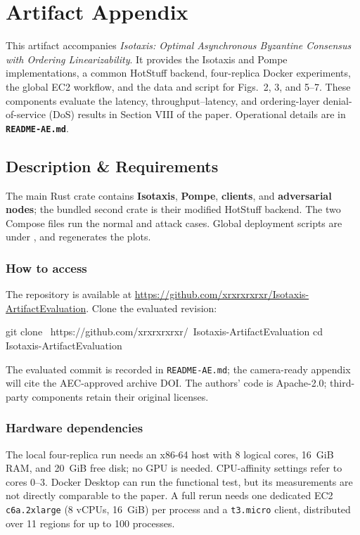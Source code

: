 \documentclass[conference]{IEEEtran}
\begin{document}

\appendices
\section{Artifact Appendix}

This artifact accompanies \emph{Isotaxis: Optimal Asynchronous Byzantine
Consensus with Ordering Linearizability}.  It provides the Isotaxis and Pompe
implementations, a common HotStuff backend, four-replica Docker experiments,
the global EC2 workflow, and the data and script for Figs.~2, 3, and 5--7.
These components evaluate the latency, throughput--latency, and ordering-layer
denial-of-service (DoS) results in Section VIII of the paper.  Operational
details are in \textbf{\texttt{README-AE.md}}.

\subsection{Description \& Requirements}

The main Rust crate contains \textbf{Isotaxis}, \textbf{Pompe}, \textbf{clients}, and \textbf{adversarial nodes};
the bundled second crate is their modified HotStuff backend.  The two Compose
files run the normal and attack cases.  Global deployment scripts are under
, and  regenerates the plots.

\subsubsection{How to access}

The repository is available at
\url{https://github.com/xrxrxrxrxr/Isotaxis-ArtifactEvaluation}.  Clone the
evaluated revision:

\begin{commandbox}
git clone \
  https://github.com/xrxrxrxrxr/\
Isotaxis-ArtifactEvaluation
cd Isotaxis-ArtifactEvaluation
\end{commandbox}

The evaluated commit is recorded in \texttt{README-AE.md}; the camera-ready
appendix will cite the AEC-approved archive DOI.  The authors' code is
Apache-2.0; third-party components retain their original licenses.

\subsubsection{Hardware dependencies}

The local four-replica run needs an x86-64 host with 8 logical cores, 16~GiB
RAM, and 20~GiB free disk; no GPU is needed.  CPU-affinity settings refer to
cores 0--3.  Docker Desktop can run the functional test, but its measurements
are not directly comparable to the paper.  A full rerun needs one dedicated
EC2 \texttt{c6a.2xlarge} (8 vCPUs, 16~GiB) per process and a
\texttt{t3.micro} client, distributed over 11 regions for up to 100 processes.
\end{document}
